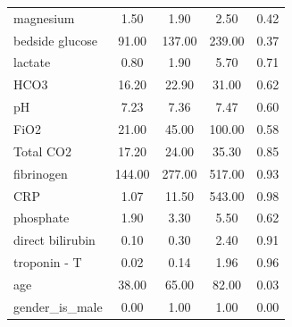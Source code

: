 \begin{table}[h!]
\begin{tabular}{lcccc}
    magnesium & 1.50 & 1.90 & 2.50 & 0.42 \\
    bedside glucose & 91.00 & 137.00 & 239.00 & 0.37 \\
    lactate & 0.80 & 1.90 & 5.70 & 0.71 \\
    HCO3 & 16.20 & 22.90 & 31.00 & 0.62 \\
    pH & 7.23 & 7.36 & 7.47 & 0.60 \\
    FiO2 & 21.00 & 45.00 & 100.00 & 0.58 \\
    Total CO2 & 17.20 & 24.00 & 35.30 & 0.85 \\
    fibrinogen & 144.00 & 277.00 & 517.00 & 0.93 \\
    CRP & 1.07 & 11.50 & 543.00 & 0.98 \\
    phosphate & 1.90 & 3.30 & 5.50 & 0.62 \\
    direct bilirubin & 0.10 & 0.30 & 2.40 & 0.91 \\
    troponin - T & 0.02 & 0.14 & 1.96 & 0.96 \\
    age & 38.00 & 65.00 & 82.00 & 0.03 \\
    gender\_is\_male & 0.00 & 1.00 & 1.00 & 0.00 \\
    \bottomrule
\end{tabular}
\end{table}